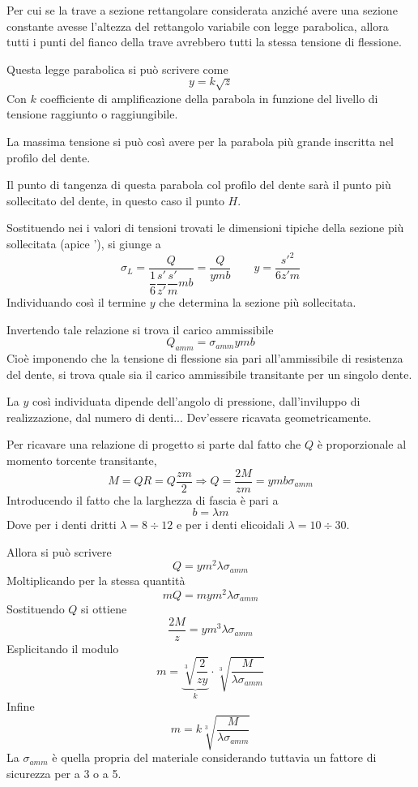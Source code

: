 \documentclass[a4paper, 15pt]{article}
\begin{document}
\begin{adjustwidth}{2in}{}
Per cui se la trave a sezione rettangolare considerata anziché avere una sezione constante  avesse l'altezza del rettangolo variabile con legge parabolica, allora tutti i punti del fianco della trave avrebbero tutti la stessa tensione di flessione. 

\newpage

Questa legge parabolica si può scrivere come 
\[y = k\sqrt{z}\]
Con $k$ coefficiente di amplificazione della parabola in funzione del livello di tensione raggiunto o raggiungibile.

La massima tensione si può così avere per la parabola più grande inscritta nel profilo del dente. 

Il punto di tangenza di questa parabola col profilo del dente sarà il punto più sollecitato del dente, in questo caso il punto $H$. 

Sostituendo nei i valori di tensioni trovati le dimensioni tipiche della sezione più sollecitata (apice '), si giunge a 
\[\sigma_L = \dfrac{Q}{\dfrac{1}{6}\dfrac{s'}{z'}\dfrac{s'}{m}mb} = \dfrac{Q}{ymb} \qquad y = \dfrac{s'^2}{6z'm}\]
Individuando così il termine $y$ che determina la sezione più sollecitata. \newline 

Invertendo tale relazione si trova il carico ammissibile 
\[Q_{amm} = \sigma_{amm}ymb\]
Cioè imponendo che la tensione di flessione  sia pari all'ammissibile di resistenza del dente, si trova quale sia il carico ammissibile transitante per un singolo dente. \newline 

La $y$ così individuata dipende dell'angolo di pressione, dall'inviluppo di realizzazione, dal numero di denti... Dev'essere ricavata geometricamente. 

Per ricavare una relazione di progetto si parte dal fatto che $Q$ è proporzionale al momento torcente transitante, 
\[M = QR = Q\dfrac{zm}{2} \Rightarrow Q = \dfrac{2M}{zm} = ymb\sigma_{amm}\]
Introducendo il fatto che la larghezza di fascia è pari a 
\[b = \lambda m\]
Dove per i denti dritti $\lambda = 8\div12$ e per i denti elicoidali $\lambda=10\div30$.

Allora si può scrivere 
\[Q = ym^2\lambda\sigma_{amm}\]
Moltiplicando per la stessa quantità 
\[mQ = mym^2\lambda\sigma_{amm}\]
Sostituendo $Q$ si ottiene
\[\dfrac{2M}{z} = ym^3\lambda\sigma_{amm}\]
Esplicitando il modulo
\[m = \underbrace{\sqrt[3]{\dfrac{2}{zy}}}_{k}\cdot\sqrt[3]{\dfrac{M}{\lambda\sigma_{amm}}}\]
Infine 
\[m =k\sqrt[3]{\dfrac{M}{\lambda\sigma_{amm}}}\]
La $\sigma_{amm}$ è quella propria del materiale considerando tuttavia un fattore di sicurezza per a 3 o a 5. \newline 


\end{adjustwidth}
\end{document}
